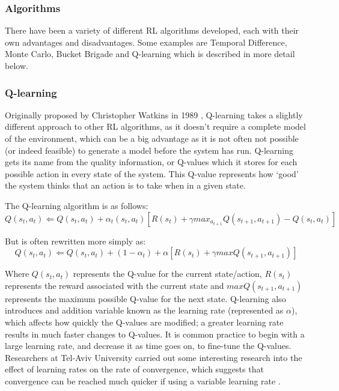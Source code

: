 \documentclass[a4paper,oneside]{report}
\begin{document}
\subsubsection{Algorithms}

There have been a variety of different RL algorithms developed, each with their own advantages and disadvantages. Some examples are Temporal Difference, Monte Carlo, Bucket Brigade and Q-learning which is described in more detail below.

\subsubsection{Q-learning}

Originally proposed by Christopher Watkins in 1989 \cite{Watkins:1989mi}, Q-learning takes a slightly different approach to other RL algorithms, as it doesn't require a complete model of the environment, which can be a big advantage as it is not often not possible (or indeed feasible) to generate a model before the system has run. Q-learning gets its name from the quality information, or Q-values which it stores for each possible action in every state of the system. This Q-value represents how `good' the system thinks that an action is to take when in a given state.

\noindent The Q-learning algorithm is as follows:
\begin{equation*}
	Q(s_t,a_t) \Leftarrow Q(s_t, a_t) + \alpha_t(s_t, a_t)[R(s_t) + \gamma max_{a_{t+1}} Q(s_{t+1}, a_{t+1}) - Q(s_t, a_t)]
\end{equation*}

\noindent But is often rewritten more simply as:
\begin{equation*}
	Q(s_t,a_t) \Leftarrow Q(s_t, a_t) + (1 -\alpha_t) + \alpha[R(s_t) + \gamma max Q(s_{t+1}, a_{t+1})]
\end{equation*}

Where $Q(s_t, a_t)$ represents the Q-value for the current state/action, $R(s_t)$ represents the reward associated with the current state and $max Q(s_{t+1}, a_{t+1})$ represents the maximum possible Q-value for the next state. Q-learning also introduces and addition variable known as the learning rate (represented as $\alpha$), which affects how quickly the Q-values are modified; a greater learning rate results in much faster changes to Q-values. It is common practice to begin with a large learning rate, and decrease it as time goes on, to fine-tune the Q-values. Researchers at Tel-Aviv University carried out some interesting research into the effect of learning rates on the rate of convergence, which suggests that convergence can be reached much quicker if using a variable learning rate \cite{Even-Dar:2003jl}.
\end{document}
